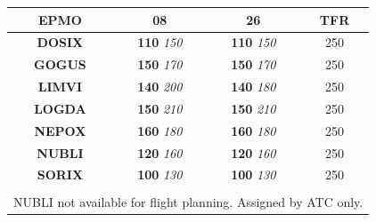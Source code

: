 \centering
{}
\begin{tabular}{|c|c|c|c|}
	\rowcolor{white}
	\hline
	\cellcolor{vred}\color{white}\textbf{EPMO} & \textbf{08}               & \textbf{26}               & \textbf{TFR} \\\hline
	\textbf{DOSIX}                             & \textbf{110} \textit{150} & \textbf{110} \textit{150} & 250          \\\hline
	\textbf{GOGUS}                             & \textbf{150} \textit{170} & \textbf{150} \textit{170} & 250          \\\hline
	\textbf{LIMVI}                             & \textbf{140} \textit{200} & \textbf{140} \textit{180} & 250          \\\hline
	\textbf{LOGDA}                             & \textbf{150} \textit{210} & \textbf{150} \textit{210} & 250          \\\hline
	\textbf{NEPOX}                             & \textbf{160} \textit{180} & \textbf{160} \textit{180} & 250          \\\hline
	\textbf{NUBLI}                             & \textbf{120} \textit{160} & \textbf{120} \textit{160} & 250          \\\hline
	\textbf{SORIX}                             & \textbf{100} \textit{130} & \textbf{100} \textit{130} & 250          \\\hline
	\multicolumn{4}{|c|}{}                                                                                            \\\hline
	\multicolumn{4}{|c|}{NUBLI not available for flight planning. Assigned by ATC only.}                              \\\hline
\end{tabular}
